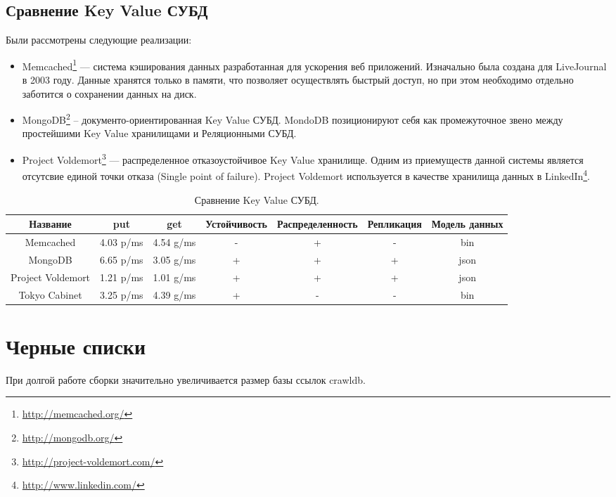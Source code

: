 \subsection{Сравнение Key Value СУБД}
Были рассмотрены следующие реализации:
\begin{itemize}
 \item Memcached\footnote{\href{http://memcached.org/}{http://memcached.org/}} --- система кэширования данных разработанная для ускорения веб приложений. Изначально была создана для LiveJournal в 2003 году. Данные хранятся только в памяти, что позволяет осуществлять быстрый доступ, но при этом необходимо отдельно заботится о сохранении данных на диск.
 \item MongoDB\footnote{\href{http://mongodb.org/}{http://mongodb.org/}} -- документо-ориентированная Key Value СУБД. MondoDB позиционируют себя как промежуточное звено между простейшими Key Value хранилищами и Реляционными СУБД.
 \item Project Voldemort\footnote{\href{http://project-voldemort.com/}{http://project-voldemort.com/}} --- распределенное отказоустойчивое Key Value хранилище. Одним из приемуществ данной системы является отсутсвие единой точки отказа (Single point of failure). Project Voldemort используется в качестве хранилища данных в LinkedIn\footnote{\href{http://www.linkedin.com/}{http://www.linkedin.com/}}.
\end{itemize}

\begin{table}[h]
\caption{\label{tab:crawlers}Сравнение Key Value СУБД.}
\begin{center}

\begin{tabular}{|c|c|c|c|c|c|c|}
\hline
Название & put & get & Устойчивость & Распределенность & Репликация & Модель данных\\
\hline
Memcached & 4.03 p/ms & 4.54 g/ms & - & + & - & bin\\
\hline
MongoDB & 6.65 p/ms & 3.05 g/ms & + & + & + & json\\
\hline
Project Voldemort & 1.21 p/ms & 1.01 g/ms & + & + & + & json\\
\hline
Tokyo Cabinet & 3.25 p/ms & 4.39 g/ms & + & - & - & bin\\
\hline
\end{tabular}

\end{center}
\end{table}


\section{Черные списки}
При долгой работе сборки значительно увеличивается размер базы ссылок crawldb.

